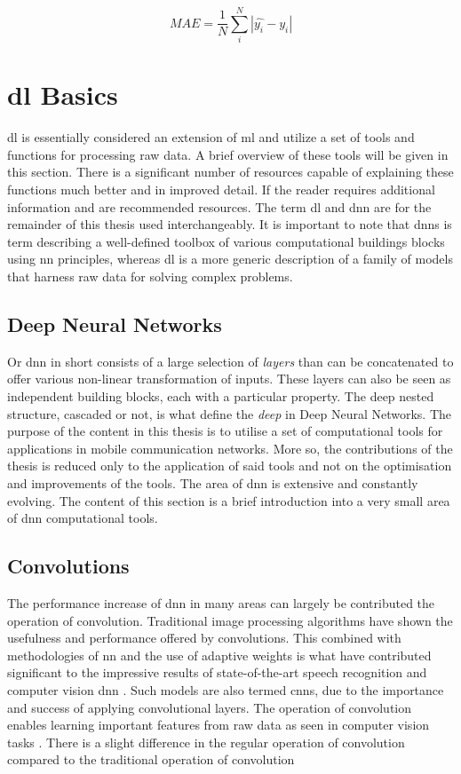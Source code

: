 \begin{equation}
    MAE =  \frac{1}{N} \sum_i^N |\hat{y_i} - y_i|
\end{equation}


\section{\acrlong{dl} Basics}\label{sec:dlbasics}

\gls{dl} is essentially considered an extension of \gls{ml} and utilize a set of tools and functions for processing raw data. A brief overview of these tools will be given in this section. There is a significant number of resources capable of explaining these functions much better and in improved detail. If the reader requires additional information \cite{Nielsen2015} and \cite{Goodfellow-et-al-2016} are recommended resources. The term \gls{dl} and \gls{dnn} are for the remainder of this thesis used interchangeably. It is important to note that \glspl{dnn} is term describing a well-defined toolbox of various computational buildings blocks using \gls{nn} principles, whereas \gls{dl} is a more generic description of a family of models that harness raw data for solving complex problems.

\subsection{Deep Neural Networks}
Or \gls{dnn} in short consists of a large selection of \emph{layers} than can be concatenated to offer various non-linear transformation of inputs. These layers can also be seen as independent building blocks, each with a particular property. The deep nested structure, cascaded or not, is what define the \emph{deep} in Deep Neural Networks. The purpose of the content in this thesis is to utilise a set of computational tools for applications in mobile communication networks. More so, the contributions of the thesis is reduced only to the application of said tools and not on the optimisation and improvements of the tools. The area of \gls{dnn} is extensive and constantly evolving. The content of this section is a brief introduction into a very small area of \gls{dnn} computational tools. 

\subsection{Convolutions}\label{sec:convolutions}
The performance increase of \gls{dnn} in many areas can largely be contributed the operation of convolution. Traditional image processing algorithms have shown the usefulness and performance offered by convolutions. This combined with methodologies of \gls{nn} and the use of adaptive weights is what have contributed significant to the impressive results of state-of-the-art speech recognition and computer vision \gls{dnn} \cite{Goodfellow-et-al-2016}. Such models are also termed \glspl{cnn}, due to the importance and success of applying convolutional layers. The operation of convolution enables learning important features from raw data as seen in computer vision tasks \cite{LeCun2015}. There is a slight difference in the regular operation of convolution compared to the traditional operation of convolution

